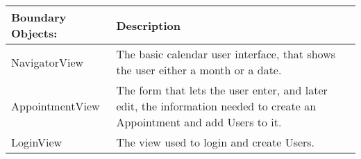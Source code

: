{\tabulinesep=1.2mm
\begin{tabu}{ | p{6cm} | p{10cm} |}
    \hline
\textbf{Boundary Objects:}	& 		\textbf{Description}\\ \hline
    NavigatorView	      	&       The basic calendar user interface, that shows the user either a month or a date.\\\hline
    AppointmentView  		&       The form that lets the user enter, and later edit, the information needed to create an Appointment and add Users to it.\\\hline
    LoginView  				&       The view used to login and create Users.\\\hline
\end{tabu}
}
